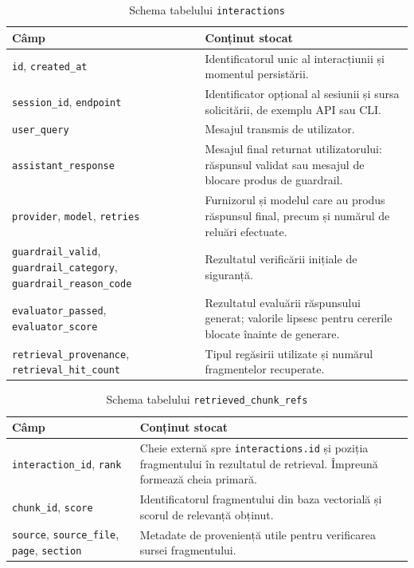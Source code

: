 \documentclass[12pt, a4paper, oneside, romanian]{teza-upb}
\begin{document}
\begin{table}[H]
\centering
\caption{Schema tabelului \texttt{interactions}}
\begin{tabular}{|p{4cm}|p{9.2cm}|}
\hline
\textbf{Câmp} & \textbf{Conținut stocat} \\
\hline
\texttt{id}, \texttt{created\_at} & Identificatorul unic al interacțiunii și momentul persistării. \\
\hline
\texttt{session\_id}, \texttt{endpoint} & Identificator opțional al sesiunii și sursa solicitării, de exemplu API sau CLI. \\
\hline
\texttt{user\_query} & Mesajul transmis de utilizator. \\
\hline
\texttt{assistant\_response} & Mesajul final returnat utilizatorului: răspunsul validat sau mesajul de blocare produs de guardrail. \\
\hline
\texttt{provider}, \texttt{model}, \texttt{retries} & Furnizorul și modelul care au produs răspunsul final, precum și numărul de reluări efectuate. \\
\hline
\texttt{guardrail\_valid}, \texttt{guardrail\_category}, \texttt{guardrail\_reason\_code} & Rezultatul verificării inițiale de siguranță. \\
\hline
\texttt{evaluator\_passed}, \texttt{evaluator\_score} & Rezultatul evaluării răspunsului generat; valorile lipsesc pentru cererile blocate înainte de generare. \\
\hline
\texttt{retrieval\_provenance}, \texttt{retrieval\_hit\_count} & Tipul regăsirii utilizate și numărul fragmentelor recuperate. \\
\hline
\end{tabular}
\label{tab:interaction-storage}
\end{table}

\begin{table}[H]
\centering
\caption{Schema tabelului \texttt{retrieved\_chunk\_refs}}
\begin{tabular}{|p{4cm}|p{9.2cm}|}
\hline
\textbf{Câmp} & \textbf{Conținut stocat} \\
\hline
\texttt{interaction\_id}, \texttt{rank} & Cheie externă spre \texttt{interactions.id} și poziția fragmentului în rezultatul de retrieval. Împreună formează cheia primară. \\
\hline
\texttt{chunk\_id}, \texttt{score} & Identificatorul fragmentului din baza vectorială și scorul de relevanță obținut. \\
\hline
\texttt{source}, \texttt{source\_file}, \texttt{page}, \texttt{section} & Metadate de proveniență utile pentru verificarea sursei fragmentului. \\
\hline
\end{tabular}
\label{tab:retrieved-chunk-storage}
\end{table}
\end{document}
